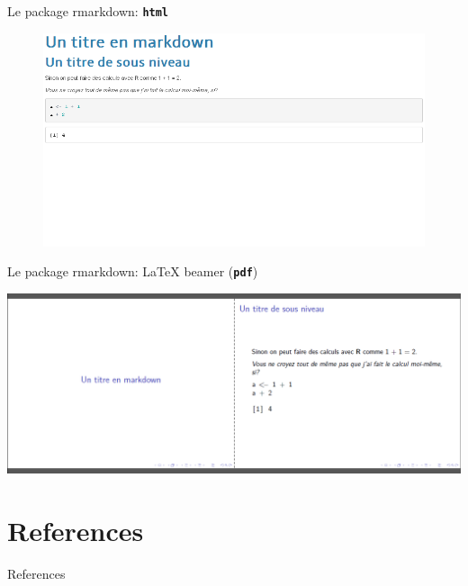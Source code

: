 \documentclass[10pt, xcolors={RGB}, hyperref={pdfpagelabels=false,
        colorlinks=true,
        linkcolor=black,
        urlcolor=black,
        citecolor=black,
        filecolor=black,
        menucolor=black,
        pdftex=true,
        bookmarks=true,
        bookmarksopen=true,
        hyperfootnotes=true}]{beamer}
\newcommand\cmdb[1]{\texttt{\color{dodgerblue}\textbf{#1}}}
\begin{document}
\begin{frame}{Le package rmarkdown: \cmdb{html}}
\begin{center}
    \begin{figure}
        \includegraphics[width=0.75\paperwidth, keepaspectratio]{figures/html.png}
    \end{figure}
\end{center}
\end{frame}

\begin{frame}{Le package rmarkdown: \LaTeX{} beamer (\cmdb{pdf})}
\begin{center}
    \begin{table}
        \includegraphics[width=0.75\paperwidth, keepaspectratio]{figures/beamer.png}
    \end{table}
\end{center}
\end{frame}


\section{References}
\begin{frame}{References}%
    
    
    \nocite{*}
\end{frame}
\end{document}
